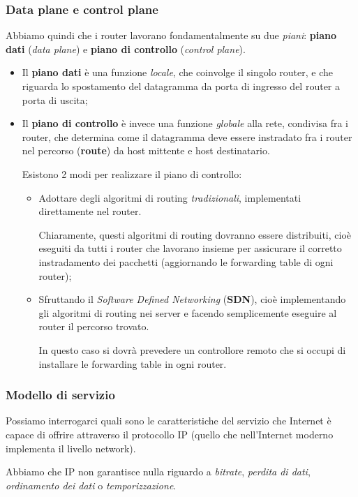 \documentclass[a4paper,11pt]{article}
\begin{document}
\subsubsection{Data plane e control plane}
Abbiamo quindi che i router lavorano fondamentalmente su due \textit{piani}: \textbf{piano dati} (\textit{data plane}) e \textbf{piano di controllo} (\textit{control plane}).
\begin{itemize}
	\item Il \textbf{piano dati} è una funzione \textit{locale}, che coinvolge il singolo router, e che riguarda lo spostamento del datagramma da porta di ingresso del router a porta di uscita;
	\item Il \textbf{piano di controllo} è invece una funzione \textit{globale} alla rete, condivisa fra i router, che determina come il datagramma deve essere instradato fra i router nel percorso (\textbf{route}) da host mittente e host destinatario.

		Esistono 2 modi per realizzare il piano di controllo:
		\begin{itemize}
			\item Adottare degli algoritmi di routing \textit{tradizionali}, implementati direttamente nel router. 

				Chiaramente, questi algoritmi di routing dovranno essere distribuiti, cioè eseguiti da tutti i router che lavorano insieme per assicurare il corretto instradamento dei pacchetti (aggiornando le forwarding table di ogni router);
			\item Sfruttando il \textit{Software Defined Networking} (\textbf{SDN}), cioè implementando gli algoritmi di routing nei server e facendo semplicemente eseguire al router il percorso trovato.

			In questo caso si dovrà prevedere un controllore remoto che si occupi di installare le forwarding table in ogni router.
		\end{itemize}
\end{itemize}

\subsubsection{Modello di servizio}
Possiamo interrogarci quali sono le caratteristiche del servizio che Internet è capace di offrire attraverso il protocollo IP (quello che nell'Internet moderno implementa il livello network).

Abbiamo che IP non garantisce nulla riguardo a \textit{bitrate}, \textit{perdita di dati}, \textit{ordinamento dei dati} o \textit{temporizzazione}.
\end{document}
